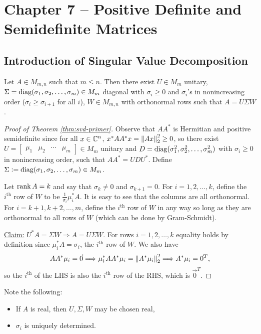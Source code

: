 \section{Chapter 7 -- Positive Definite and Semidefinite Matrices}

\subsection{Introduction of Singular Value Decomposition}
\begin{theorem}
\label{thm:svd-primer}
Let $A \in M_{m,n}$ such that $m \leq n$. Then there exist $U \in M_m$ unitary, $\Sigma = \operatorname{diag}(\sigma_1, \sigma_2, \dots, \sigma_m) \in M_m$ diagonal with $\sigma_i \geq 0$ and $\sigma_i$'s in nonincreasing order ($\sigma_i \geq \sigma_{i+1}$ for all $i$), $W \in M_{m,n}$ with orthonormal rows such that $A = U\Sigma W$.
\end{theorem}

\begin{proof}[Proof of Theorem \ref{thm:svd-primer}]
Observe that $AA^*$ is Hermitian and positive semidefinite since for all $x \in \mathbb C^n$, $x^*AA^*x = \left\lVert Ax\right\rVert_2^2 \geq 0$, so there exist $U = [\begin{array}{c|c|c|c} \mu_1 & \mu_2 & \cdots & \mu_m \end{array}] \in M_m$ unitary and $D = \operatorname{diag}(\sigma_1^2, \sigma_2^2, \dots, \sigma_m^2)$ with $\sigma_i \geq 0$ in nonincreasing order, such that $AA^* = UDU^*$. Define $\Sigma \vcentcolon= \operatorname{diag}(\sigma_1, \sigma_2, \dots, \sigma_m) \in M_m$.

Let $\operatorname{rank} A = k$ and say that $\sigma_k \not= 0$ and $\sigma_{k+1} = 0$. For $i = 1, 2, \dots, k$, define the $i^{\text{th}}$ row of $W$ to be $\frac{1}{\sigma_i} \mu_i^* A$. It is easy to see that the columns are all orthonormal. For $i = k+1, k+2, \dots, m$, define the $i^{\text{th}}$ row of $W$ in any way so long as they are orthonormal to all rows of $W$ (which can be done by Gram-Schmidt).

\underline{Claim:} $U^*A = \Sigma W \Longrightarrow A = U\Sigma W$.
\noindent For rows $i = 1, 2, \dots, k$ equality holds by definition since $\mu_i^* A = \sigma_i$, the $i^{\text{th}}$ row of $W$. We also have
$$
AA^*\mu_i = \Vec{0} \Longrightarrow \mu_i^*AA^*\mu_i = \left\lVert A^*\mu_i\right\rVert_2^2 \Longrightarrow A^*\mu_i = \Vec{0}^T,
$$
so the $i^{\text{th}}$ of the LHS is also the $i^{\text{th}}$ row of the RHS, which is $\Vec{0}^T$.
\end{proof}

\begin{remark*}
Note the following:
\begin{itemize}
    \item If $A$ is real, then $U, \Sigma, W$ may be chosen real,
    \item $\sigma_i$ is uniquely determined.
\end{itemize}
\end{remark*}

